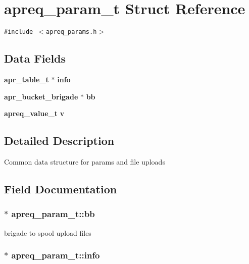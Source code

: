 \section{apreq\_\-param\_\-t Struct Reference}
\label{structapreq__param__t}
{\tt \#include $<$apreq\_\-params.h$>$}

\subsection*{Data Fields}
\begin{CompactItemize}
\item 
{\bf apr\_\-table\_\-t} $\ast$ {\bf info}
\item 
{\bf apr\_\-bucket\_\-brigade} $\ast$ {\bf bb}
\item 
{\bf apreq\_\-value\_\-t} {\bf v}
\end{CompactItemize}


\subsection{Detailed Description}
Common data structure for params and file uploads 



\subsection{Field Documentation}
\subsubsection{$\ast$ apreq\_\-param\_\-t::bb}\label{structapreq__param__t_m1}


brigade to spool upload files 
\subsubsection{$\ast$ apreq\_\-param\_\-t::info}\label{structapreq__param__t_m0}


